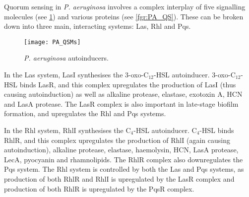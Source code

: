 Quorum sensing in \textit{P. aeruginosa} involves a complex interplay of five signalling molecules (see \ref{fgr:PA_autoinducers}) and various proteins (see \ref{fgr:PA_QS})\cite{Dubern2008,Hodgkinson2011,Jimenez2012}.
These can be broken down into three main, interacting systems: Las, Rhl and Pqs.

\begin{figure}[H]
	\begin{center}
		\texttt{[image: PA\_QSMs]}
		\caption{\textit{P. aeruginosa} autoinducers. \label{fgr:PA_autoinducers}}
	\end{center}
\end{figure}

In the Las system, LasI\cite{Wargo2007} synthesises the 3-oxo-C$_{12}$-HSL \cite{Pearson1994} autoinducer. 
3-oxo-C$_{12}$-HSL  binds LasR\cite{Gambello1991}, and this complex upregulates the production of LasI\cite{Pesci1997} (thus causing autoinduction) as well as 
alkaline protease\cite{Gambello1993}, elastase\cite{Gambello1991}, exotoxin A\cite{Gambello1993}, HCN\cite{Pessi2000} and LasA protease\cite{Toder1991}.
The LasR complex is also important in late-stage biofilm formation\cite{Sauer2002}, and upregulates the Rhl\cite{Latifi1996} and Pqs systems\cite{Gallagher2002,Wade2005}.

In the Rhl system, RhlI\cite{Brint1995} synthesises the C$_4$-HSL \cite{Pearson1995} autoinducer. 
C$_4$-HSL  binds RhlR\cite{Winson1995}, and this complex upregulates the production of RhlI\cite{Pesci1997} (again causing autoinduction), 
alkaline protease\cite{Latifi1995}, elastase\cite{Brint1995}, haemolysin\cite{Latifi1995}, HCN\cite{Pessi2000,Latifi1995}, LasA protease\cite{Brint1995}, LecA\cite{Winzer2000}, pyocyanin\cite{Brint1995,Latifi1995} and rhamnolipids\cite{Brint1995}.
The RhlR complex also downregulates the Pqs system\cite{McGrath2004,Wade2005}.
The Rhl system is controlled by both the Las and Pqs systems,
as production of both RhlR and RhlI is upregulated by the LasR complex\cite{Latifi1996} 
and production of both RhlR is upregulated by the PqsR complex\cite{McKnight2000}.


